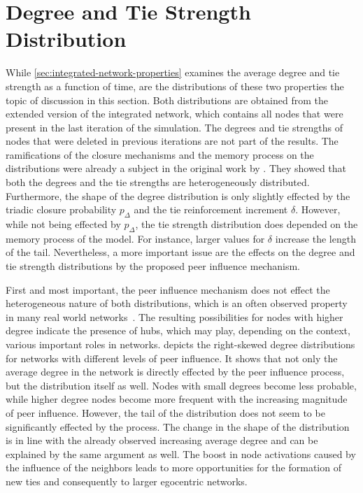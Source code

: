 

\section{Degree and Tie Strength Distribution}
\label{sec:weight-and-degree-distribution}

While \cref{sec:integrated-network-properties} examines the average degree and tie strength as a function of time, are the distributions of these two properties the topic of discussion in this section.
Both distributions are obtained from the extended version of the integrated network, which contains all nodes that were present in the last iteration of the simulation.
The degrees and tie strengths of nodes that were deleted in previous iterations are not part of the results.
The ramifications of the closure mechanisms and the memory process on the distributions were already a subject in the original work by \citet{Laurent2015}.
They showed that both the degrees and the tie strengths are heterogeneously distributed.
Furthermore, the shape of the degree distribution is only slightly effected by the triadic closure probability \( p_{\Delta} \) and the tie reinforcement increment \( \delta \).
However, while not being effected by \( p_{\Delta} \), the tie strength distribution does depended on the memory process of the model.
For instance, larger values for \( \delta \) increase the length of the tail.
Nevertheless, a more important issue are the effects on the degree and tie strength distributions by the proposed peer influence mechanism.

First and most important, the peer influence mechanism does not effect the heterogeneous nature of both distributions, which is an often observed property in many real world networks~\cite{Barabasi2002, Karsai2014}.
The resulting possibilities for nodes with higher degree indicate the presence of hubs, which may play, depending on the context, various important roles in networks.
 depicts the right-skewed degree distributions for networks with different levels of peer influence.
It shows that not only the average degree in the network is directly effected by the peer influence process, but the distribution itself as well.
Nodes with small degrees become less probable, while higher degree nodes become more frequent with the increasing magnitude of peer influence.
However, the tail of the distribution does not seem to be significantly effected by the process.
The change in the shape of the distribution is in line with the already observed increasing average degree and can be explained by the same argument as well.
The boost in node activations caused by the influence of the neighbors leads to more opportunities for the formation of new ties and consequently to larger egocentric networks.


